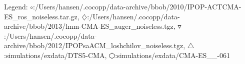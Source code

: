 Legend: {\color{NavyBlue}$\circ$}:/Users/hansen/.cocopp/data-archive/bbob/2010/IPOP-ACTCMA-ES\_ros\_noiseless.tar.gz, {\color{Magenta}$\diamondsuit$}:/Users/hansen/.cocopp/data-archive/bbob/2013/lmm-CMA-ES\_auger\_noiseless.tgz, {\color{CornflowerBlue}$\triangledown$}:/Users/hansen/.cocopp/data-archive/bbob/2012/IPOPsaACM\_loshchilov\_noiseless.tgz, {\color{YellowGreen}$\triangle$}:simulations/exdata/DTS5-CMA, {\color{red}$\varhexagon$}:simulations/exdata/CMA-ES\_\_-061